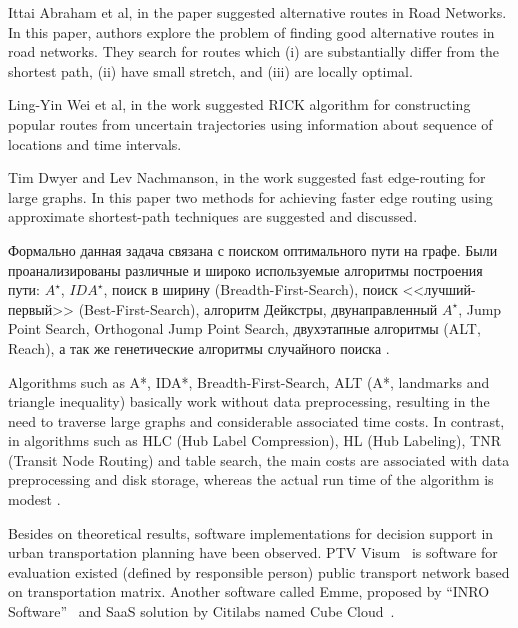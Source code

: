 Ittai Abraham et al, in the paper \cite{abraham2013alternative} suggested alternative routes in Road 
Networks. In this paper, authors explore the problem of finding good alternative routes in road networks. 
They search for routes which (i) are substantially differ from the shortest path, (ii) have small stretch, 
and (iii) are locally optimal. 

Ling-Yin Wei et al, in the work \cite{wei2012constructing} suggested RICK algorithm for constructing 
popular routes from uncertain trajectories using information about sequence of locations and time 
intervals.

Tim Dwyer and Lev Nachmanson, in the work \cite{dwyer2009fast} suggested fast edge-routing for large 
graphs. In this paper two methods for achieving faster edge routing using approximate shortest-path 
techniques are suggested and discussed.

Формально данная задача связана с поиском оптимального пути на графе. Были проанализированы различные и 
широко используемые алгоритмы построения пути: \( A^\star \), \( IDA^\star \), поиск в ширину 
(Breadth-First-Search), поиск <<лучший-первый>> (Best-First-Search), алгоритм Дейкстры, двунаправленный 
\( A^\star \), Jump Point Search, Orthogonal Jump Point Search, двухэтапные алгоритмы (ALT, Reach), а 
так же генетические алгоритмы случайного поиска \cite{bib:19}. 

Algorithms such as A*, IDA*, Breadth-First-Search, ALT (A*, landmarks and triangle inequality) basically 
work without data preprocessing, resulting in the need to traverse large graphs and considerable 
associated time costs. In contrast, in algorithms such as HLC (Hub Label Compression), HL (Hub Labeling), 
TNR (Transit Node Routing) and table search, the main costs are associated with data preprocessing and 
disk storage, whereas the actual run time of the algorithm is modest \cite{bib:21}.

Besides on theoretical results, software implementations for decision support in urban transportation 
planning have been observed. PTV Visum~\cite{bib:6} is software for evaluation existed (defined by 
responsible person) public transport network based on transportation matrix. Another software called 
Emme, proposed by ``INRO Software''~\cite{bib:7} and SaaS solution by Citilabs named 
Cube Cloud~\cite{bib:8}.


